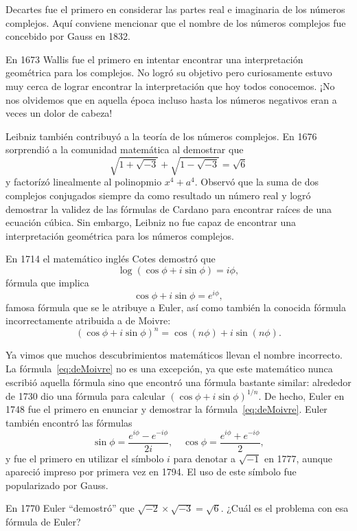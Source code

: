 Decartes fue el primero en considerar las partes real e imaginaria de los
números complejos. Aquí conviene mencionar que el nombre de los números
complejos fue concebido por Gauss en 1832. 

En 1673 Wallis fue el primero en intentar encontrar una interpretación
geométrica para los complejos. No logró su objetivo pero curiosamente estuvo
muy cerca de lograr encontrar la interpretación que hoy todos conocemos. ¡No
nos olvidemos que en aquella época incluso hasta los números negativos eran a
veces un dolor de cabeza!

Leibniz también contribuyó a la teoría de los números complejos. En 1676
sorprendió a la comunidad matemática al demostrar que
\[
	\sqrt{1+\sqrt{-3}}+\sqrt{1-\sqrt{-3}}=\sqrt{6}
\]
y factorízó linealmente al polinopmio $x^4+a^4$.  Observó que la suma de dos
complejos conjugados siempre da como resultado un número real y logró demostrar
la validez de las fórmulas de Cardano para encontrar raíces de una ecuación
cúbica.  Sin embargo, Leibniz no fue capaz de encontrar una interpretación
geométrica para los números complejos. 

En 1714 el matemático inglés Cotes demostró que
\[
	\log(\cos\phi+i\sin\phi)=i\phi,
\]
fórmula que implica 
\[
	\cos\phi+i\sin\phi=e^{i\phi},
\]
famosa fórmula que se le atribuye a Euler, así como también la conocida fórmula
incorrectamente atribuida a de Moivre:
\begin{equation}
	\label{eq:deMoivre}
	(\cos\phi+i\sin\phi)^n=\cos(n\phi)+i\sin(n\phi).
\end{equation}

Ya vimos que muchos descubrimientos matemáticos llevan el nombre incorrecto. La
fórmula~\ref{eq:deMoivre} no es una excepción, ya que este matemático nunca
escribió aquella fórmula sino que encontró una fórmula bastante similar:
alrededor de 1730 dio una fórmula para calcular $(\cos\phi+i\sin\phi)^{1/n}$.
De hecho, 
Euler en 1748 fue el primero en enunciar y demostrar la
fórmula~\eqref{eq:deMoivre}. Euler también encontró las fórmulas
\[
	\sin\phi=\frac{e^{i\phi}-e^{-i\phi}}{2i},\quad
	\cos\phi=\frac{e^{i\phi}+e^{-i\phi}}{2},
\]
y fue el primero en utilizar el símbolo $i$ para denotar a $\sqrt{-1}$ en 1777,
aunque apareció impreso por primera vez en 1794. El uso de este símbolo fue
popularizado por Gauss.

\begin{exercise}
	En 1770 Euler ``demostró'' que $\sqrt{-2}\times\sqrt{-3}=\sqrt{6}$. ¿Cuál
	es el problema con esa fórmula de Euler?
\end{exercise}

